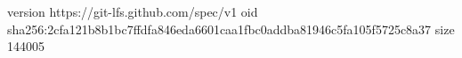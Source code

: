 version https://git-lfs.github.com/spec/v1
oid sha256:2cfa121b8b1bc7ffdfa846eda6601caa1fbc0addba81946c5fa105f5725c8a37
size 144005
